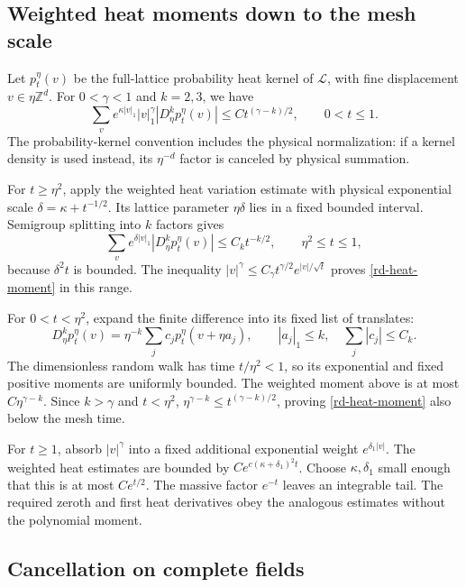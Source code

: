 \documentclass[11pt]{article}
\theoremstyle{remark}
\begin{document}
\subsection{Weighted heat moments down to the mesh scale}

Let $p_t^\eta(v)$ be the full-lattice probability heat kernel of
$\mathcal L$, with fine displacement $v\in\eta\mathbb Z^d$.
For $0<\gamma<1$ and $k=2,3$, we have
\begin{equation}\label{rd-heat-moment}
 \sum_v e^{\kappa|v|_1}|v|_1^\gamma
                   |D_\eta^kp_t^\eta(v)|
       \le Ct^{(\gamma-k)/2},\qquad0<t\le1.
\end{equation}
The probability-kernel convention includes the physical normalization:
if a kernel density is used instead, its $\eta^{-d}$ factor is
canceled by physical summation.

For $t\ge\eta^2$, apply the weighted heat variation estimate with
physical exponential scale $\delta=\kappa+t^{-1/2}$. Its lattice
parameter $\eta\delta$ lies in a fixed bounded interval. Semigroup
splitting into $k$ factors gives
\[
 \sum_v e^{\delta|v|_1}|D_\eta^kp_t^\eta(v)|
                \le C_kt^{-k/2},\qquad \eta^2\le t\le1,
\]
because $\delta^2t$ is bounded. The inequality
$|v|^\gamma\le C_\gamma t^{\gamma/2}e^{|v|/\sqrt t}$
proves \eqref{rd-heat-moment} in this range.

For $0<t<\eta^2$, expand the finite difference into its fixed list
of translates:
\[
 D_\eta^kp_t^\eta(v)
    =\eta^{-k}\sum_jc_jp_t^\eta(v+\eta a_j),
 \qquad |a_j|_1\le k,\quad\sum_j|c_j|\le C_k.
\]
The dimensionless random walk has time $t/\eta^2<1$, so its
exponential and fixed positive moments are uniformly bounded.
The weighted moment above is at most $C\eta^{\gamma-k}$.
Since $k>\gamma$ and $t<\eta^2$,
$\eta^{\gamma-k}\le t^{(\gamma-k)/2}$, proving
\eqref{rd-heat-moment} also below the mesh time.

For $t\ge1$, absorb $|v|^\gamma$ into a fixed additional
exponential weight $e^{\delta_1|v|}$. The weighted heat estimates
are bounded by $Ce^{c(\kappa+\delta_1)^2t}$. Choose
$\kappa,\delta_1$ small enough that this is at most $Ce^{t/2}$.
The massive factor $e^{-t}$ leaves an integrable tail. The required
zeroth and first heat derivatives obey the analogous estimates
without the polynomial moment.

\subsection{Cancellation on complete fields}
\end{document}
